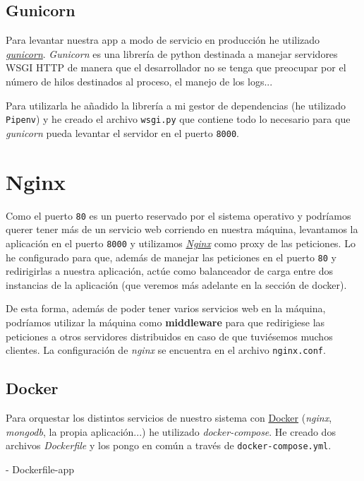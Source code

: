 \documentclass{article}
\begin{document}
\subsection{Gunicorn}

Para levantar nuestra app a modo de servicio en producción he utilizado \href{http://gunicorn.org/}{\emph{gunicorn}}. \emph{Gunicorn} es una librería de python destinada a manejar servidores WSGI HTTP de manera que el desarrollador no se tenga que preocupar por el número de hilos destinados al proceso, el manejo de los logs...

Para utilizarla he añadido la librería a mi gestor de dependencias (he utilizado \texttt{Pipenv}) y he creado el archivo \texttt{wsgi.py} que contiene todo lo necesario para que \emph{gunicorn} pueda levantar el servidor en el puerto \texttt{8000}.

\section{Nginx}

Como el puerto \texttt{80} es un puerto reservado por el sistema operativo y podríamos querer tener más de un servicio web corriendo en nuestra máquina, levantamos la aplicación en el puerto \texttt{8000} y utilizamos \href{https://nginx.org/en/}{\emph{Nginx}} como proxy de las peticiones. Lo he configurado para que, además de manejar las peticiones en el puerto \texttt{80} y redirigirlas a nuestra aplicación, actúe como balanceador de carga entre dos instancias de la aplicación (que veremos más adelante en la sección de docker).

De esta forma, además de poder tener varios servicios web en la máquina, podríamos utilizar la máquina como \textbf{middleware} para que redirigiese las peticiones a otros servidores distribuidos en caso de que tuviésemos muchos clientes. La configuración de \emph{nginx} se encuentra en el archivo \texttt{nginx.conf}.

\subsection{Docker}

Para orquestar los distintos servicios de nuestro sistema con \href{https://www.docker.com/}{Docker} (\emph{nginx}, \emph{mongodb}, la propia aplicación...) he utilizado \emph{docker-compose}. He creado dos archivos \emph{Dockerfile} y los pongo en común a través de \texttt{docker-compose.yml}.

- Dockerfile-app
\end{document}
